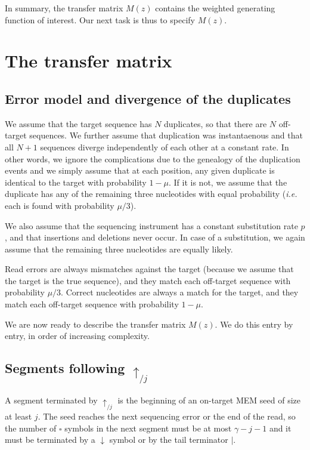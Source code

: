 \documentclass{article}
\begin{document}
In summary, the transfer matrix $M(z)$ contains the weighted generating
function of interest. Our next task is thus to specify $M(z)$.



\section{The transfer matrix}
\label{sec:transfer_mat}


\subsection{Error model and divergence of the duplicates}

We assume that the target sequence has $N$ duplicates, so that there are
$N$ off-target sequences. We further assume that duplication was
instantaenous and that all $N+1$ sequences diverge independently of each
other at a constant rate. In other words, we ignore the complications due
to the genealogy of the duplication events and we simply assume that at
each position, any given duplicate is identical to the target with
probability $1-\mu$. If it is not, we assume that the duplicate has any of
the remaining three nucleotides with equal probability (\textit{i.e.} each
is found with probability $\mu/3$).

We also assume that the sequencing instrument has a constant substitution
rate $p$, and that insertions and deletions never occur. In case of a
substitution, we again assume that the remaining three nucleotides are
equally likely.

Read errors are always mismatches against the target (because we assume
that the target is the true sequence), and they match each off-target
sequence with probability $\mu/3$. Correct nucleotides are always a match
for the target, and they match each off-target sequence with probability
$1-\mu$.

We are now ready to describe the transfer matrix $M(z)$. We do this entry
by entry, in order of increasing complexity.


\subsection{Segments following $\uparrow_{/j}$}

A segment terminated by $\uparrow_{/j}$ is the beginning of an on-target
MEM seed of size at least $j$. The seed reaches the next sequencing
error or the end of the read, so the number of $\square$ symbols in the
next segment must be at most $\gamma-j-1$ and it must be terminated by a
$\downarrow$ symbol or by the tail terminator $|$.
\end{document}
